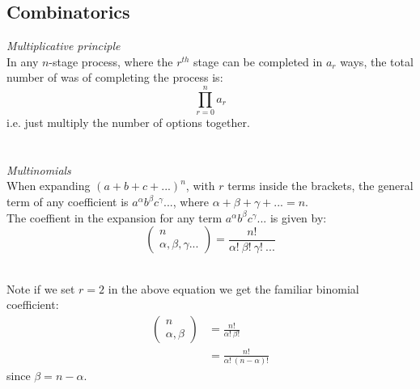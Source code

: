 \documentclass{scrartcl}
\begin{document}
\subsection{Combinatorics}
\textit{Multiplicative principle}
\\
In any $ n $-stage process, where the $ r^{th} $ stage can be completed in $ a_{r} $ ways, the total number of was of completing the process is:
\begin{equation}
\prod_{r = 0}^{n} a_{r}
\end{equation}
i.e. just multiply the number of options together.
\\\\
\\
\textit{Multinomials}
\\
When expanding $ (a + b + c + ...)^{n} $, with $ r $ terms inside the brackets, the general term of any coefficient is $ a^{\alpha} b^{\beta} c^{\gamma}... $, where $ \alpha + \beta + \gamma + ... = n $.
\\
The coeffient in the expansion for any term $ a^{\alpha} b^{\beta} c^{\gamma}... $ is given by:
\begin{equation}
\begin{pmatrix}
n \\ \alpha,  \beta,  \gamma ...
\end{pmatrix}
=
\frac{n!}{\alpha! \ \beta! \ \gamma! \ ... }
\end{equation}
\\
\begin{tcolorbox}[breakable]
Note if we set $ r = 2 $ in the above equation we get the familiar binomial coefficient:
\begin{align}
\begin{pmatrix}
n \\ \alpha,  \beta
\end{pmatrix}
& =
\frac{n!}{\alpha! \ \beta!} \\
& = \frac{n!}{\alpha! \ (n - \alpha)!}
\end{align}
since $ \beta = n - \alpha $.
\end{tcolorbox}
\end{document}
